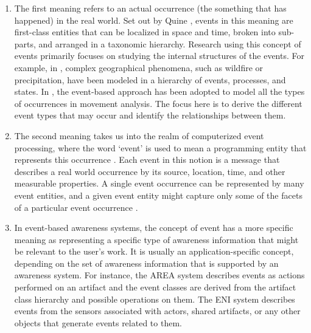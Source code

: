 \begin{enumerate}
   \item The first meaning refers to an actual occurrence (the something that has happened) in the real world. Set out by Quine \cite{quine1985events}, events in this meaning are first-class entities that can be localized in space and time, broken into sub-parts, and arranged in a taxonomic hierarchy. Research using this concept of events primarily focuses on studying the internal structures of the events. For example, in \cite{Yuan2001}, complex geographical phenomena, such as wildfire or precipitation, have been modeled in a hierarchy of events, processes, and states. In \cite{Andrienko2011}, the event-based approach has been adopted to model all the types of occurrences in movement analysis. The focus here is to derive the different event types that may occur and identify the relationships between them.
   \item The second meaning takes us into the realm of computerized event processing, where the word `event' is used to mean a programming entity that represents this occurrence \cite{Spiteri2000}. Each event in this notion is a message that describes a real world occurrence by its source, location, time, and other measurable properties. A single event occurrence can be represented by many event entities, and a given event entity might capture only some of the facets of a particular event occurrence \cite{Etzion2010}.
   \item In event-based awareness systems, the concept of event has a more specific meaning as representing a specific type of awareness information that might be relevant to the user's work. It is usually an application-specific concept, depending on the set of awareness information that is supported by an awareness system. For instance, the AREA system \cite{fuchs1999a} describes events as actions performed on an artifact and the event classes are derived from the artifact class hierarchy and possible operations on them. The ENI system \cite{Gross2004} describes events from the sensors associated with actors, shared artifacts, or any other objects that generate events related to them. 
\end{enumerate}

